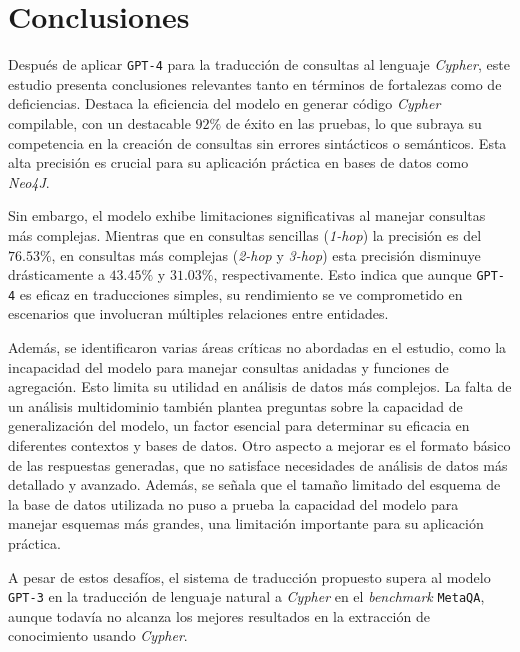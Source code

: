 \chapter*{Conclusiones}\label{chapter:conclusions}
Después de aplicar \texttt{GPT-4} para la traducción de consultas al lenguaje \textit{Cypher}, este estudio presenta conclusiones relevantes tanto en términos de fortalezas como de deficiencias. Destaca la eficiencia del modelo en generar código \textit{Cypher} compilable, con un destacable $92\%$ de éxito en las pruebas, lo que subraya su competencia en la creación de consultas sin errores sintácticos o semánticos. Esta alta precisión es crucial para su aplicación práctica en bases de datos como \textit{Neo4J}.

Sin embargo, el modelo exhibe limitaciones significativas al manejar consultas más complejas. Mientras que en consultas sencillas (\textit{1-hop}) la precisión es del $76.53\%$, en consultas más complejas (\textit{2-hop} y \textit{3-hop}) esta precisión disminuye drásticamente a $43.45\%$ y $31.03\%$, respectivamente. Esto indica que aunque \texttt{GPT-4} es eficaz en traducciones simples, su rendimiento se ve comprometido en escenarios que involucran múltiples relaciones entre entidades.

Además, se identificaron varias áreas críticas no abordadas en el estudio, como la incapacidad del modelo para manejar consultas anidadas y funciones de agregación. Esto limita su utilidad en análisis de datos más complejos. La falta de un análisis multidominio también plantea preguntas sobre la capacidad de generalización del modelo, un factor esencial para determinar su eficacia en diferentes contextos y bases de datos. Otro aspecto a mejorar es el formato básico de las respuestas generadas, que no satisface necesidades de análisis de datos más detallado y avanzado. Además, se señala que el tamaño limitado del esquema de la base de datos utilizada no puso a prueba la capacidad del modelo para manejar esquemas más grandes, una limitación importante para su aplicación práctica.

A pesar de estos desafíos, el sistema de traducción propuesto supera al modelo \texttt{GPT-3} en la traducción de lenguaje natural a \textit{Cypher} en el \textit{benchmark} \texttt{MetaQA}, aunque todavía no alcanza los mejores resultados en la extracción de conocimiento usando \textit{Cypher}. 

